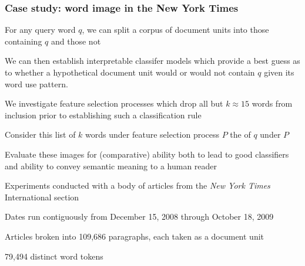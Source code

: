 \documentclass[10pt,slidestop,fxcolor=pst,dvips]{beamer}
\newcommand{\Blue}[1]{\color{blue}{#1}}
\begin{document}
\begin{frame}

\frametitle{Case study: word image in the New York Times}
\vtiny
\bit

\item For any query word $q$, we can split a corpus of document units into those containing $q$ and those not
\vtiny
\item We can then establish interpretable classifer models which provide a best guess as to whether a hypothetical document
unit would or would not contain $q$ given its word use pattern.
\vtiny
\item We investigate feature selection processes which drop all but $k \approx 15$ words from inclusion prior to
establishing such a  classification rule
{\small{\bit
\item Consider this list of $k$ words under feature selection process $P$ the {\Blue{image}} of $q$ under $P$
\item Evaluate these images for (comparative) ability both to lead to good classifiers and ability to convey semantic meaning to a human reader
\eit}
}
\vtiny
\item Experiments conducted with a body of articles from the {\itshape{New York Times}} International section
{\small{\bit
\item Dates run contiguously from December 15, 2008 through October 18, 2009
\item Articles broken into 109,686 paragraphs, each taken as a document unit
\item 79,494 distinct word tokens
\eit}}

\eit

\end{frame}

\end{document}

